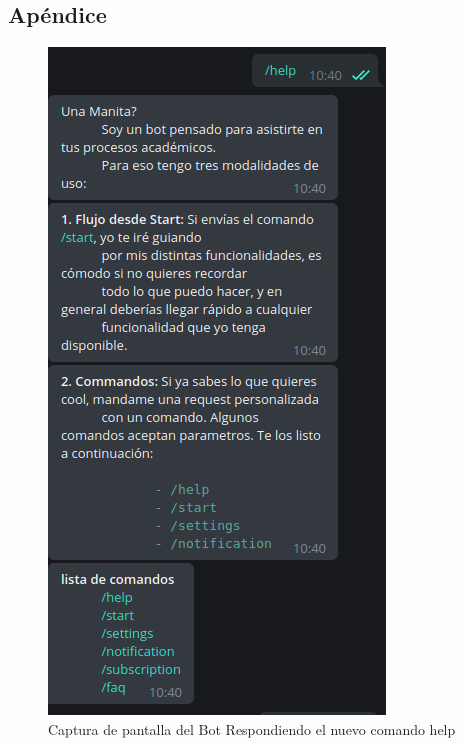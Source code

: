 \newpage
\begin{appendices}
    \chapter*{Apéndice}
\end{appendices}

\begin{figure}[h]
    \centering
    \includegraphics[scale=0.5]{media/imagenes/sc/help.png}
    \caption[Bot help]{Captura de pantalla del Bot Respondiendo el nuevo comando help}
\end{figure}